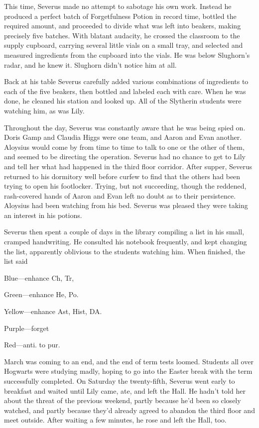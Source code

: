 This time, Severus made no attempt to sabotage his own work. Instead he produced a perfect batch of Forgetfulness Potion in record time, bottled the required amount, and proceeded to divide what was left into beakers, making precisely five batches. With blatant audacity, he crossed the classroom to the supply cupboard, carrying several little vials on a small tray, and selected and measured ingredients from the cupboard into the vials. He was below Slughorn's radar, and he knew it. Slughorn didn't notice him at all.

Back at his table Severus carefully added various combinations of ingredients to each of the five beakers, then bottled and labeled each with care. When he was done, he cleaned his station and looked up. All of the Slytherin students were watching him, as was Lily.

Throughout the day, Severus was constantly aware that he was being spied on. Doris Gamp and Claudia Higgs were one team, and Aaron and Evan another. Aloysius would come by from time to time to talk to one or the other of them, and seemed to be directing the operation. Severus had no chance to get to Lily and tell her what had happened in the third floor corridor. After supper, Severus returned to his dormitory well before curfew to find that the others had been trying to open his footlocker. Trying, but not succeeding, though the reddened, rash-covered hands of Aaron and Evan left no doubt as to their persistence. Aloysius had been watching from his bed. Severus was pleased they were taking an interest in his potions.

Severus then spent a couple of days in the library compiling a list in his small, cramped handwriting. He consulted his notebook frequently, and kept changing the list, apparently oblivious to the students watching him. When finished, the list said

Blue—enhance Ch, Tr,

Green—enhance He, Po.

Yellow—enhance Ast, Hist, DA.

Purple—forget

Red—anti. to pur.

March was coming to an end, and the end of term tests loomed. Students all over Hogwarts were studying madly, hoping to go into the Easter break with the term successfully completed. On Saturday the twenty-fifth, Severus went early to breakfast and waited until Lily came, ate, and left the Hall. He hadn't told her about the threat of the previous weekend, partly because he'd been so closely watched, and partly because they'd already agreed to abandon the third floor and meet outside. After waiting a few minutes, he rose and left the Hall, too.

